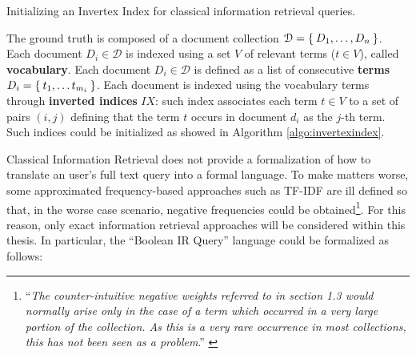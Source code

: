 \begin{algorithm}[!t]
\begin{algorithmic}
	\EndIf
	\EndFor
\EndFor	
\end{algorithmic}
\caption{Initializing an Invertex Index for classical information retrieval queries.}
\label{algo:invertexindex}	
\end{algorithm}


\begin{definition}
The ground truth is composed of a document collection $\mathcal{D}=\Set{D_1,\dots, D_n}$. Each document $D_i\in \mathcal{D}$ is indexed using a set $V$ of relevant terms ($t\in V$), called \textbf{vocabulary}. Each document $D_i\in \mathcal{D}$ is defined as a list of consecutive \textbf{terms} $D_i=\Set{t_1,\dots t_{m_i}}$. Each document is indexed using the vocabulary terms through \textbf{inverted indices} $IX$: such index associates  each term $t\in V$ to a set of pairs $(i,j)$ defining that the term $t$ occurs in document $d_i$ as the $j$-th term. Such indices could be initialized as showed in Algorithm \ref{algo:invertexindex}.
\end{definition} 

Classical Information Retrieval does not provide a formalization of how to translate an user's full text query into a formal language. To make matters worse, some approximated frequency-based approaches such as TF-IDF are ill defined so that, in the worse case scenario, negative frequencies could be obtained\footnote{``\textit{The counter-intuitive negative weights referred to in section 1.3 would normally arise only in the case of a term which occurred in a very large portion of the collection. As this is a very rare occurrence in most collections, this has not been seen as a problem}.'' \cite{IDFNegative}}. For this reason, only exact information retrieval approaches will be considered within this thesis. In particular, the ``Boolean IR Query'' language could be formalized as follows:


